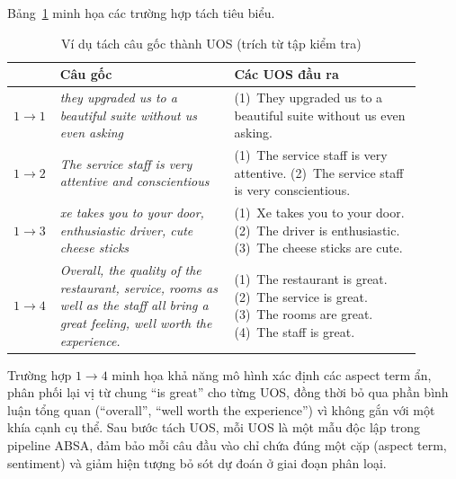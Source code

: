 Bảng~\ref{tab:uos_examples} minh họa các trường hợp tách tiêu biểu.

\begin{table}[H]
\centering
\caption{Ví dụ tách câu gốc thành UOS (trích từ tập kiểm tra)}
\label{tab:uos_examples}
\small
\begin{tabular}{p{0.07\linewidth} p{0.40\linewidth} p{0.43\linewidth}}
\toprule
\textbf{} & \textbf{Câu gốc} & \textbf{Các UOS đầu ra} \\
\midrule
$1{\to}1$ &
\textit{they upgraded us to a beautiful suite without us even asking} &
(1)~They upgraded us to a beautiful suite without us even asking. \\[6pt]

$1{\to}2$ &
\textit{The service staff is very attentive and conscientious} &
(1)~The service staff is very attentive. \newline
(2)~The service staff is very conscientious. \\[6pt]

$1{\to}3$ &
\textit{xe takes you to your door, enthusiastic driver, cute cheese sticks} &
(1)~Xe takes you to your door. \newline
(2)~The driver is enthusiastic. \newline
(3)~The cheese sticks are cute. \\[6pt]

$1{\to}4$ &
\textit{Overall, the quality of the restaurant, service, rooms as well as the staff all bring a great feeling, well worth the experience.} &
(1)~The restaurant is great. \newline
(2)~The service is great. \newline
(3)~The rooms are great. \newline
(4)~The staff is great. \\
\bottomrule
\end{tabular}
\end{table}

Trường hợp $1{\to}4$ minh họa khả năng mô hình xác định các aspect
term ẩn, phân phối lại vị từ chung ``is great'' cho từng UOS, đồng
thời bỏ qua phần bình luận tổng quan (``overall'', ``well worth the
experience'') vì không gắn với một khía cạnh cụ thể.
Sau bước tách UOS, mỗi UOS là một mẫu độc lập trong pipeline ABSA,
đảm bảo mỗi câu đầu vào chỉ chứa đúng một cặp (aspect term, sentiment)
và giảm hiện tượng bỏ sót dự đoán ở giai đoạn phân loại.
